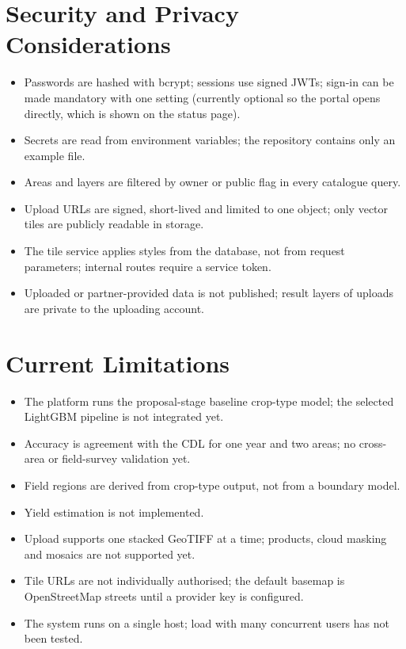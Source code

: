 \section{Security and Privacy Considerations}
\begin{itemize}
  \item Passwords are hashed with bcrypt; sessions use signed JWTs; sign-in can be made mandatory with
        one setting (currently optional so the portal opens directly, which is shown on the status
        page).
  \item Secrets are read from environment variables; the repository contains only an example file.
  \item Areas and layers are filtered by owner or public flag in every catalogue query.
  \item Upload URLs are signed, short-lived and limited to one object; only vector tiles are publicly
        readable in storage.
  \item The tile service applies styles from the database, not from request parameters; internal
        routes require a service token.
  \item Uploaded or partner-provided data is not published; result layers of uploads are private to
        the uploading account.
\end{itemize}

\section{Current Limitations}
\begin{itemize}
  \item The platform runs the proposal-stage baseline crop-type model; the selected LightGBM pipeline
        is not integrated yet.
  \item Accuracy is agreement with the CDL for one year and two areas; no cross-area or field-survey
        validation yet.
  \item Field regions are derived from crop-type output, not from a boundary model.
  \item Yield estimation is not implemented.
  \item Upload supports one stacked GeoTIFF at a time;  products, cloud masking and
        mosaics are not supported yet.
  \item Tile URLs are not individually authorised; the default basemap is OpenStreetMap streets until
        a provider key is configured.
  \item The system runs on a single host; load with many concurrent users has not been tested.
\end{itemize}
